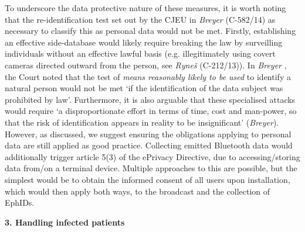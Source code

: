 \documentclass[12pt,a4paper]{article}
\begin{document}
To underscore the data protective nature of these measures, it is worth noting that the
re-identification test set out by the CJEU in \textit{Breyer} (C-582/14) as necessary to classify this as personal data would not be met. Firstly, establishing an effective side-database would likely require breaking the law by surveilling individuals without an effective lawful basis (e.g. illegitimately using covert cameras directed outward from the person, see \textit{Ryneš} (C-212/13)). In \textit{Breyer} , the Court noted that the test of \textit{means reasonably likely to be used} to identify a natural person would not be met ‘if the identification of the data subject was prohibited by law’. Furthermore, it is also arguable that these specialised attacks would require ‘a disproportionate effort in terms of time, cost and man-power, so that the risk of identification appears in reality to be insignificant’ (\textit{Breyer}). However, as discussed, we suggest ensuring the obligations applying to personal data are still applied as good practice. Collecting emitted Bluetooth data would additionally trigger article 5(3) of the ePrivacy Directive, due to accessing/storing data from/on a terminal device. Multiple approaches to this are possible, but the simplest would be to obtain the informed consent of all users upon installation, which would then apply both ways, to the broadcast and the collection of EphIDs.


\textbf{3. Handling infected patients}
\end{document}
